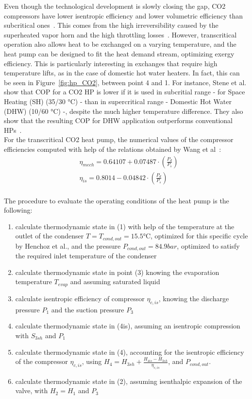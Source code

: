 \documentclass{article}
\begin{document}
Even though the technological development is slowly closing the gap, CO2 compressors have lower isentropic efficiency and lower volumetric efficiency than subcritical ones~\cite{sarkarSimulationTranscriticalCO22006}. This comes from the high irreversibility caused by the superheated vapor horn and the high throttling losses~\cite{yangTheoreticalExperimentalInvestigation2016}. 
However, transcritical operation also allows heat to be exchanged on a varying temperature, and the heat pump can be designed to fit the heat demand stream, optimizing exergy efficiency. This is particularly interesting in exchanges that require high temperature lifts, as in the case of domestic hot water heaters. In fact, this can be seen in Figure~\ref{fig:hp_CO2}, between point 4 and 1.  For instance, Stene et al. show that COP for a CO2 HP is lower if it is used in subcritial range - for Space Heating (SH) (35/30 \si{\celsius}) - than in supercritical range - Domestic Hot Water (DHW) (10/60 \si{\celsius}) -, despite the much higher temperature difference. They also show that the resulting COP for DHW application outperforms conventional HPs~\cite{steneINTEGRATEDCO2HEAT2007}.\\

For the transcritical CO2 heat pump, the numerical values of the compressor efficiencies computed with help of the relations obtained by Wang et al~\cite{wangExperimentalInvestigationAirsource2013}:
\begin{align}
	& \eta_{mech} = 0.64107+0.07487\cdot(\frac{P_{d}}{P_{s}})\\
	& \eta_{is} = 0.8014-0.04842\cdot(\frac{P_{d}}{P_{s}})\\
\end{align}

The procedure to evaluate the operating conditions of the heat pump is the following:
\begin{enumerate}
	\item calculate thermodynamic state in (1) with help of the temperature at the outlet of the condenser $T = T_{cond,out} = 15.5 \si{\celsius}$, optimized for this specific cycle by Henchoz et al.\cite{henchozPerformanceProfitabilityPerspectives2015}, and the pressure $P_{cond,out} = 84.9 bar$, optimized to satisfy the required inlet temperature of the condenser
	\item calculate thermodynamic state in point (3) knowing the evaporation temperature $T_{evap}$ and assuming saturated liquid
	\item calculate isentropic efficiency of compressor $\eta_{c,is}$, knowing the discharge pressure $P_{1}$ and the suction pressure $P_{3}$
	\item calculate thermodynamic state in (4is), assuming an isentropic compression with $S_{3sh}$ and $P_{1}$
	\item calculate thermodynamic state in (4), accounting for the isentropic efficiency of the compressor $\eta_{c,is}$, using $H_{4} = H_{3sh} + \frac{H_{4is} - H_{3sh}}{\eta_{c,is}}$, and $P_{cond,out}$.
	\item calculate thermodynamic state in (2), assuming isenthalpic expansion of the valve, with $H_{2} = H_{1}$ and $P_{3}$
\end{enumerate}
\end{document}
